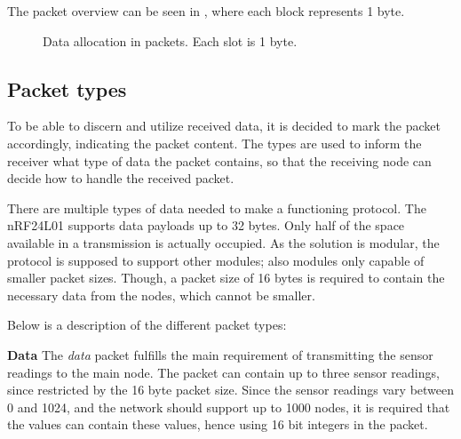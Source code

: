 The packet overview can be seen in , where each block represents 1 byte.
\begin{figure}[h!]
	\centering
	\caption{Data allocation in packets. Each slot is 1 byte.}
	\label{fig:dataalloc}
\end{figure}


\subsection{Packet types}
To be able to discern and utilize received data, it is decided to mark the packet accordingly, indicating the packet content.
The types are used to inform the receiver what type of data the packet contains, so that the receiving node can decide how to handle the received packet. 

There are multiple types of data needed to make a functioning protocol. The nRF24L01 supports data payloads up to 32 bytes. Only half of the space available in a transmission is actually occupied. As the solution is modular, the protocol is supposed to support other modules; also modules only capable of smaller packet sizes. Though, a packet size of 16 bytes is required to contain the necessary data from the nodes, which cannot be smaller.

Below is a description of the different packet types:

\textbf{Data}\newline
The \textit{data} packet fulfills the main requirement of transmitting the sensor readings to the main node. The packet can contain up to three sensor readings, since restricted by the 16 byte packet size. Since the sensor readings vary between 0 and 1024, and the network should support up to 1000 nodes, it is required that the values can contain these values, hence using 16 bit integers in the packet.

